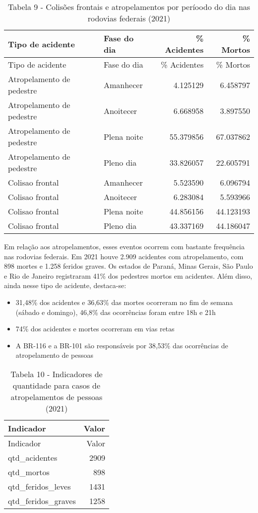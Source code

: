 \documentclass[
]{article}
\providecommand{\tightlist}{%
  \setlength{\itemsep}{0pt}\setlength{\parskip}{0pt}}
\begin{document}
\begin{longtable}[]{@{}llrr@{}}
\caption{Tabela 9 - Colisões frontais e atropelamentos por períoodo do
dia nas rodovias federais (2021)}\tabularnewline
\toprule
Tipo de acidente & Fase do dia & \% Acidentes & \% Mortos \\
\midrule
\endfirsthead
\toprule
Tipo de acidente & Fase do dia & \% Acidentes & \% Mortos \\
\midrule
\endhead
Atropelamento de pedestre & Amanhecer & 4.125129 & 6.458797 \\
Atropelamento de pedestre & Anoitecer & 6.668958 & 3.897550 \\
Atropelamento de pedestre & Plena noite & 55.379856 & 67.037862 \\
Atropelamento de pedestre & Pleno dia & 33.826057 & 22.605791 \\
Colisao frontal & Amanhecer & 5.523590 & 6.096794 \\
Colisao frontal & Anoitecer & 6.283084 & 5.593966 \\
Colisao frontal & Plena noite & 44.856156 & 44.123193 \\
Colisao frontal & Pleno dia & 43.337169 & 44.186047 \\
\bottomrule
\end{longtable}

Em relação aos atropelamentos, esses eventos ocorrem com bastante
frequência nas rodovias federais. Em 2021 houve 2.909 acidentes com
atropelamento, com 898 mortes e 1.258 feridos graves. Os estados de
Paraná, Minas Gerais, São Paulo e Rio de Janeiro registraram 41\% dos
pedestres mortos em acidentes. Além disso, ainda nesse tipo de acidente,
destaca-se:

\begin{itemize}
\tightlist
\item
  31,48\% dos acidentes e 36,63\% das mortes ocorreram no fim de semana
  (sábado e domingo), 46,8\% das ocorrências foram entre 18h e 21h
\item
  74\% dos acidentes e mortes ocorreram em vias retas
\item
  A BR-116 e a BR-101 são responsáveis por 38,53\% das ocorrências de
  atropelamento de pessoas
\end{itemize}

\begin{longtable}[]{@{}lr@{}}
\caption{Tabela 10 - Indicadores de quantidade para casos de
atropelamentos de pessoas (2021)}\tabularnewline
\toprule
Indicador & Valor \\
\midrule
\endfirsthead
\toprule
Indicador & Valor \\
\midrule
\endhead
qtd\_acidentes & 2909 \\
qtd\_mortos & 898 \\
qtd\_feridos\_leves & 1431 \\
qtd\_feridos\_graves & 1258 \\
\bottomrule
\end{longtable}
\end{document}

